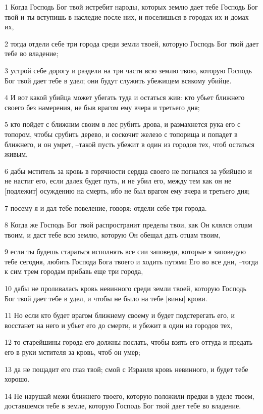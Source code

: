 \par 1 Когда Господь Бог твой истребит народы, которых землю дает тебе Господь Бог твой и ты вступишь в наследие после них, и поселишься в городах их и домах их,
\par 2 тогда отдели себе три города среди земли твоей, которую Господь Бог твой дает тебе во владение;
\par 3 устрой себе дорогу и раздели на три части всю землю твою, которую Господь Бог твой дает тебе в удел; они будут служить убежищем всякому убийце.
\par 4 И вот какой убийца может убегать туда и остаться жив: кто убьет ближнего своего без намерения, не быв врагом ему вчера и третьего дня;
\par 5 кто пойдет с ближним своим в лес рубить дрова, и размахнется рука его с топором, чтобы срубить дерево, и соскочит железо с топорища и попадет в ближнего, и он умрет, --такой пусть убежит в один из городов тех, чтоб остаться живым,
\par 6 дабы мститель за кровь в горячности сердца своего не погнался за убийцею и не настиг его, если далек будет путь, и не убил его, между тем как он не [подлежит] осуждению на смерть, ибо не был врагом ему вчера и третьего дня;
\par 7 посему я и дал тебе повеление, говоря: отдели себе три города.
\par 8 Когда же Господь Бог твой распространит пределы твои, как Он клялся отцам твоим, и даст тебе всю землю, которую Он обещал дать отцам твоим,
\par 9 если ты будешь стараться исполнять все сии заповеди, которые я заповедую тебе сегодня, любить Господа Бога твоего и ходить путями Его во все дни, --тогда к сим трем городам прибавь еще три города,
\par 10 дабы не проливалась кровь невинного среди земли твоей, которую Господь Бог твой дает тебе в удел, и чтобы не было на тебе [вины] крови.
\par 11 Но если кто будет врагом ближнему своему и будет подстерегать его, и восстанет на него и убьет его до смерти, и убежит в один из городов тех,
\par 12 то старейшины города его должны послать, чтобы взять его оттуда и предать его в руки мстителя за кровь, чтоб он умер;
\par 13 да не пощадит его глаз твой; смой с Израиля кровь невинного, и будет тебе хорошо.
\par 14 Не нарушай межи ближнего твоего, которую положили предки в уделе твоем, доставшемся тебе в земле, которую Господь Бог твой дает тебе во владение.

